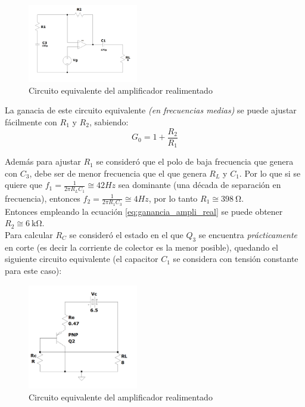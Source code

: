 \documentclass[letterpaper, 10 pt, conference]{ieeeconf}  %
\begin{document}
\begin{figure}[H]
  \centering
  \includegraphics[width=0.43\textwidth]{./imagenes/circ_eq_ampli_real.png}
  \caption{Circuito equivalente del amplificador realimentado}
  \label{fig:circ_eq_ampli_reali}
\end{figure}

La ganacia de este circuito equivalente \textit{(en frecuencias medias)} se puede ajustar fácilmente con $R_1$ y $R_2$, sabiendo:
\begin{equation} \label{eq:ganancia_ampli_real}
  G_0 = 1 + \frac{R_2}{R_1}
\end{equation}

Además para ajustar $R_1$ se consideró que el polo de baja frecuencia que genera con $C_3$, debe ser de menor frecuencia que el que genera $R_L$ y $C_1$. Por lo que si se quiere que $f_1 = \frac{1}{2{\pi}R_LC_1} \cong 42Hz$ sea dominante (una década de separación en frecuencia), entonces $f_{2} = \frac{1}{2{\pi}R_1C_3} \cong 4Hz$, por lo tanto $R_1 \cong \qty{398}{\ohm}$. \\
Entonces empleando la ecuación \ref{eq:ganancia_ampli_real} se puede obtener $R_2 \cong \qty{6}{\kilo\ohm}$. \\

Para calcular $R_C$ se consideró el estado en el que $Q_3$ se encuentra \textit{prácticamente} en corte (es decir la corriente de colector es la menor posible), quedando el siguiente circuito equivalente (el capacitor $C_1$ se considera con tensión constante para este caso):

\begin{figure}[H]
  \centering
  \includegraphics[width=0.43\textwidth]{./imagenes/circ_calculo_rc.png}
  \caption{Circuito equivalente del amplificador realimentado}
\end{figure}
\end{document}
